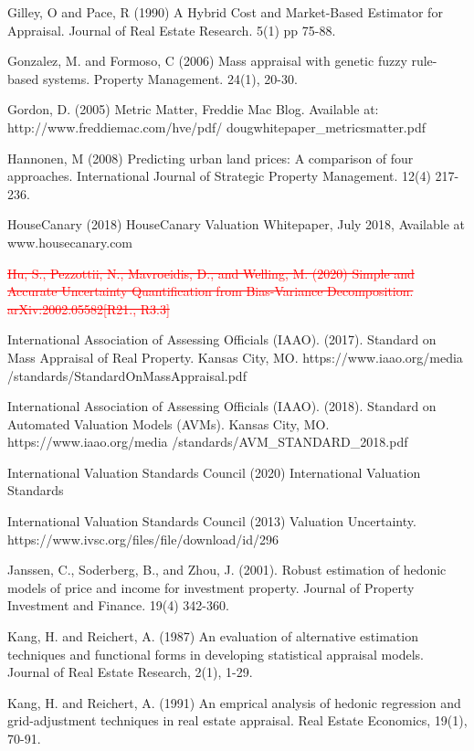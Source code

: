 \documentclass[colTwo]{anon}
\theoremstyle{definition}
\begin{document}
\begin{thebibliography}{50}
\harvarditem{}{}{}Gilley, O and Pace, R (1990) A Hybrid Cost and Market-Based Estimator for Appraisal. Journal of Real Estate Research. 5(1) pp 75-88. 

\harvarditem{}{}{}Gonzalez, M. and Formoso, C (2006) Mass appraisal with genetic fuzzy rule-based systems. Property Management. 24(1), 20-30. 

\harvarditem{}{}{}Gordon, D. (2005) Metric Matter, Freddie Mac Blog. Available at: http://www.freddiemac.com/hve/pdf/ dougwhitepaper\_metricsmatter.pdf

\harvarditem{}{}{}Hannonen, M (2008) Predicting urban land prices: A comparison of four approaches. International Journal of Strategic Property Management. 12(4) 217-236. 

\harvarditem{}{}{}HouseCanary (2018) HouseCanary Valuation Whitepaper, July 2018, Available at www.housecanary.com

\harvarditem{}{}{}\textcolor{red}{\st{Hu, S., Pezzottii, N., Mavroeidis, D., and Welling, M. (2020) Simple and Accurate Uncertainty Quantification from Bias-Variance Decomposition. arXiv:2002.05582[R21., R3.3]}}

\harvarditem{}{}{}International Association of Assessing Officials (IAAO). (2017). Standard on Mass Appraisal of Real Property. Kansas City, MO. https://www.iaao.org/media /standards/StandardOnMassAppraisal.pdf

\harvarditem{}{}{}International Association of Assessing Officials (IAAO). (2018). Standard on Automated Valuation Models (AVMs). Kansas City, MO. https://www.iaao.org/media /standards/AVM\_STANDARD\_2018.pdf

\harvarditem{}{}{}International Valuation Standards Council (2020) International Valuation Standards 

\harvarditem{}{}{}International Valuation Standards Council (2013) Valuation Uncertainty. https://www.ivsc.org/files/file/download/id/296

\harvarditem{}{}{}Janssen, C., Soderberg, B., and Zhou, J. (2001). Robust estimation of hedonic models of price and income for investment property. Journal of Property Investment and Finance. 19(4) 342-360. 

\harvarditem{}{}{}Kang, H. and Reichert, A. (1987) An evaluation of alternative estimation techniques and functional forms in developing statistical appraisal models. Journal of Real Estate Research, 2(1), 1-29. 

\harvarditem{}{}{}Kang, H. and Reichert, A. (1991) An emprical analysis of hedonic regression and grid-adjustment techniques in real estate appraisal. Real Estate Economics, 19(1), 70-91. 


\end{thebibliography}
\end{document}
